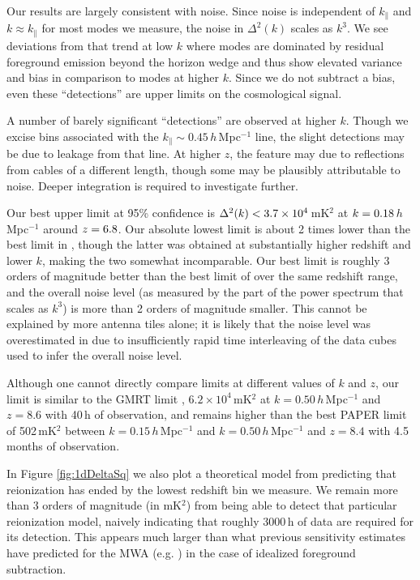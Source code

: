 Our results are largely consistent with noise. Since noise is independent of $k_\|$ and $k\approx k_\|$ for most modes we measure, the noise in $\Delta^2(k)$ scales as $k^3$. We see deviations from that trend at low $k$ where modes are dominated by residual foreground emission beyond the horizon wedge and thus show elevated variance and bias in comparison to modes at higher $k$. Since we do not subtract a bias, even these ``detections'' are upper limits on the cosmological signal.

A number of barely significant ``detections'' are observed at higher $k$. Though we excise bins associated with the $k_\| \sim 0.45$\,$h$\,Mpc$^{-1}$ line, the slight detections may be due to leakage from that line. At higher $z$, the feature may due to reflections from cables of a different length, though some may be plausibly attributable to noise. Deeper integration is required to investigate further. 

Our best upper limit at 95\% confidence is $\Delta^2(k) < 3.7\times 10^4$\,mK$^2$ at $k = 0.18$\,$h$\,Mpc$^{-1}$ around $z = 6.8$. Our absolute lowest limit is about 2 times lower than the best limit in \citet{X13}, though the latter was obtained at substantially higher redshift and lower $k$, making the two somewhat incomparable. Our best limit is roughly 3 orders of magnitude better than the best limit of \citet{X13} over the same redshift range, and the overall noise level (as measured by the part of the power spectrum that scales as $k^3$) is more than 2 orders of magnitude smaller. This cannot be explained by more antenna tiles alone; it is likely that the noise level was overestimated in \citet{X13} due to insufficiently rapid time interleaving of the data cubes used to infer the overall noise level.

Although one cannot directly compare limits at different values of $k$ and $z$, our limit is similar to the GMRT limit \citep{gmrtsignalloss}, $6.2\times 10^4$\,mK$^2$ at $k = 0.50$\,$h$\,Mpc$^{-1}$ and $z=8.6$ with 40\,h of observation, and remains higher than the best PAPER limit \citep{ali15} of 502\,mK$^2$ between $k = 0.15$\,$h$\,Mpc$^{-1}$ and $k=0.50$\,$h$\,Mpc$^{-1}$ and $z=8.4$ with 4.5 months of observation.
 
In Figure \ref{fig:1dDeltaSq} we also plot a theoretical model from \citet{BarkanaPS2009} predicting that reionization has ended by the lowest redshift bin we measure. We remain more than 3 orders of magnitude (in mK$^2$) from being able to detect that particular reionization model, naively indicating that roughly 3000\,h of data are required for its detection. This appears much larger than what previous sensitivity estimates have predicted for the MWA (e.g. \citet{beardsley13}) in the case of idealized foreground subtraction. 
 
